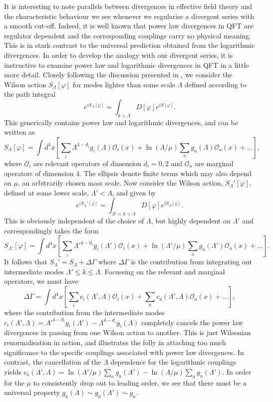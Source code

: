 \documentclass[12pt, letter]{article}
\def\be{\begin{equation}}
\def\ee{\end{equation}}
\newcommand{\Ocal}{\mathcal{O}}
\begin{document}
It is interesting to note parallels between divergences in effective field theory and the characteristic behaviour we see whenever we regularise a divergent series with a smooth cut-off.  Indeed, it is well known that power law divergences in QFT are regulator dependent and the corresponding couplings carry no physical meaning. This is in stark contrast to the universal prediction obtained from the logarithmic divergences. In order to develop the analogy with our divergent series, it is instructive to examine  power law and logarithmic divergences in QFT in a little more detail. Closely following the discussion presented in \cite{deRham:2014wfa}, we consider the Wilson action $S_\Lambda[\varphi]$ for modes lighter than some scale $\Lambda$ defined according to the path integral \cite{Burgess:2020tbq}
\be
e^{iS_\Lambda[\varphi]}=\int_{k>\Lambda} D [\varphi]e^{iS[\varphi]}.
\ee
This  generically contains power law and logarithmic divergences, and can be written as
\be
S_\Lambda[\varphi]=\int d^4 x \left[ \sum_i \Lambda^{4-d_i} g_i (\Lambda) \Ocal_i(x)+\ln(\Lambda/\mu)\sum_a g_a (\Lambda) \Ocal_a(x)+\ldots \right],
\ee
where $\Ocal_{i}$ are relevant operators of dimension  $d_i=0, 2$ and $\Ocal_{a}$ are marginal operators of dimension $4$.  The ellipsis denote finite terms which may also depend on $\mu$, an arbitrarily chosen  mass scale. Now consider the Wilson action, $S_\Lambda'[\varphi]$, defined at some lower scale, $\Lambda'<\Lambda$, and given by
\be
e^{iS_\Lambda'[\varphi]}=\int_{\Lambda'<k<\Lambda} D [\varphi]e^{iS_\Lambda[\varphi]}.
\ee
This is obviously independent of the choice of $\Lambda$, but highly dependent on $\Lambda'$ and correspondingly takes the form
\be
S_{\Lambda'}[\varphi]=\int d^4 x \left[ \sum_i \Lambda'^{4-d_i} g_i (\Lambda') \Ocal_i(x)+\ln(\Lambda'/\mu)\sum_a g_a (\Lambda') \Ocal_a(x)+\ldots \right].
\ee
It follows that $S_\Lambda'=S_\Lambda+\Delta \Gamma$ where $\Delta \Gamma$ is the contribution from integrating out intermediate modes $\Lambda' \leq k \leq \Lambda$. Focussing on the relevant and marginal operators, we must have
\be
\Delta \Gamma = \int d^4 x \left[ \sum_i c_i(\Lambda', \Lambda) \Ocal_i(x)+\sum_a c_a(\Lambda', \Lambda) \Ocal_a(x)+\ldots \right],
\ee
where the contribution from the intermediate modes $c_i(\Lambda', \Lambda)=\Lambda'^{4-d_i} g_i (\Lambda') -\Lambda^{4-d_i} g_i (\Lambda)$ completely cancels the power law divergences in passing from one Wilson action to another.  This is just Wilsonian renormalisation in action, and illustrates the folly in attaching too much  significance to the specific couplings associated with power law divergences. In contrast, the cancellation of the $\Lambda$ dependence for the  logarithmic couplings yields $c_a (\Lambda', \Lambda)= \ln(\Lambda'/\mu)\sum_a g_a (\Lambda')-\ln(\Lambda/\mu)\sum_a g_a (\Lambda')$. In order for the $\mu$ to consistently drop out to leading order, we see that there must be a universal property   $g_a(\Lambda) \sim g_a(\Lambda') \sim g_a$.
\end{document}
